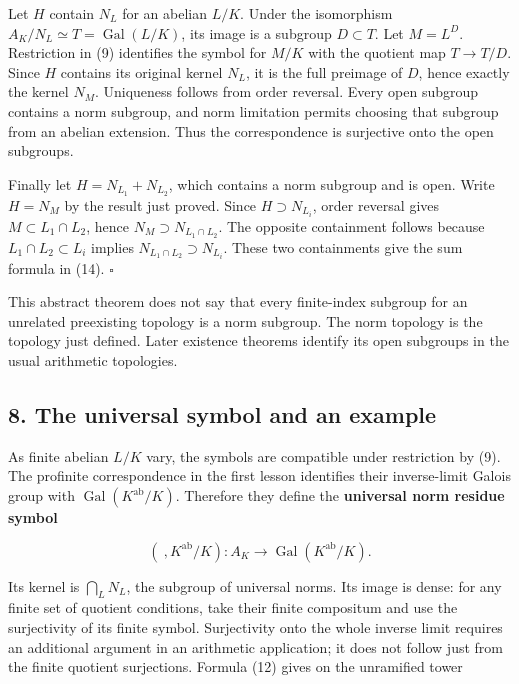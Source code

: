 \documentclass[11pt,a4paper]{article}
\begin{document}
Let \(H\) contain \(N_L\) for an abelian \(L/K\). Under the isomorphism
\(A_K/N_L\simeq T=\operatorname{Gal}(L/K)\), its image is a subgroup
\(D\subset T\). Let \(M=L^D\). Restriction in (9) identifies the symbol
for \(M/K\) with the quotient map \(T\to T/D\). Since \(H\) contains its
original kernel \(N_L\), it is the full preimage of \(D\), hence exactly
the kernel \(N_M\). Uniqueness follows from order reversal. Every open
subgroup contains a norm subgroup, and norm limitation permits choosing
that subgroup from an abelian extension. Thus the correspondence is
surjective onto the open subgroups.

Finally let \(H=N_{L_1}+N_{L_2}\), which contains a norm subgroup and is
open. Write \(H=N_M\) by the result just proved. Since
\(H\supset N_{L_i}\), order reversal gives \(M\subset L_1\cap L_2\),
hence \(N_M\supset N_{L_1\cap L_2}\). The opposite containment follows
because \(L_1\cap L_2\subset L_i\) implies
\(N_{L_1\cap L_2}\supset N_{L_i}\). These two containments give the sum
formula in (14). \(\square\)

This abstract theorem does not say that every finite-index subgroup for
an unrelated preexisting topology is a norm subgroup. The norm topology
is the topology just defined. Later existence theorems identify its open
subgroups in the usual arithmetic topologies.

\subsection{8. The universal symbol and an
example}\label{the-universal-symbol-and-an-example}

As finite abelian \(L/K\) vary, the symbols are compatible under
restriction by (9). The profinite correspondence in the first lesson
identifies their inverse-limit Galois group with
\(\operatorname{Gal}(K^{\mathrm{ab}}/K)\). Therefore they define the
\textbf{universal norm residue symbol}

\[
(\ ,K^{\mathrm{ab}}/K):A_K\longrightarrow
\operatorname{Gal}(K^{\mathrm{ab}}/K).
\tag{15}
\]

Its kernel is \(\bigcap_L N_L\), the subgroup of universal norms. Its
image is dense: for any finite set of quotient conditions, take their
finite compositum and use the surjectivity of its finite symbol.
Surjectivity onto the whole inverse limit requires an additional
argument in an arithmetic application; it does not follow just from the
finite quotient surjections. Formula (12) gives on the unramified tower
\end{document}
